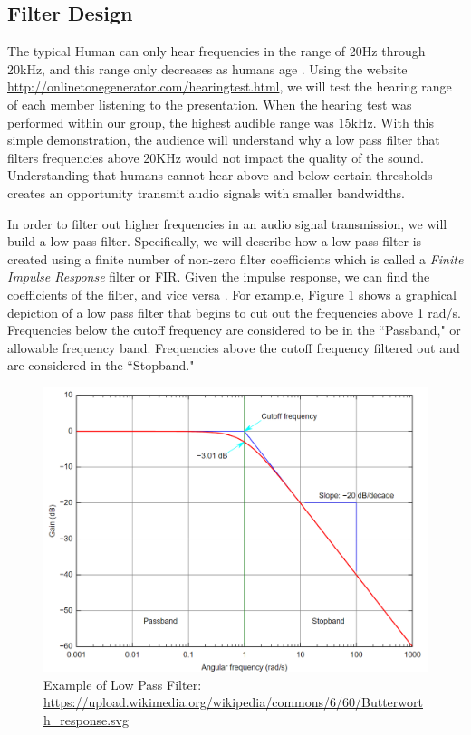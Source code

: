 \subsection{Filter Design}

The typical Human can only hear frequencies in the range of 20Hz through 20kHz, and this range only decreases as humans age  \cite{human:rg}.  Using the website \url{http://onlinetonegenerator.com/hearingtest.html}, we will test the hearing range of each member listening to the presentation.  When the hearing test was performed within our group, the highest audible range was 15kHz.  With this simple demonstration, the audience will understand why a low pass filter that filters frequencies above 20KHz would not impact the quality of the sound.  Understanding that humans cannot hear above and below certain thresholds creates an opportunity transmit audio signals with smaller bandwidths.  

In order to filter out higher frequencies in an audio signal transmission, we will build a low pass filter.  Specifically, we will describe how a low pass filter is created using a finite number of non-zero filter coefficients which is called a \textit{Finite Impulse Response} filter or FIR.  Given the impulse response, we can find the coefficients of the filter, and vice versa \cite{notes:class}.  For example, Figure \ref{fig:lowpass} shows a graphical depiction of a low pass filter that begins to cut out the frequencies above 1 rad/s.  Frequencies below the cutoff frequency are considered to be in the ``Passband," or allowable frequency band.  Frequencies above the cutoff frequency filtered out and are considered in the ``Stopband."  

\begin{figure}[h!]
	\centering
	\includegraphics[scale = .5]{low_pass.png} %
	\caption{Example of Low Pass Filter: \url{https://upload.wikimedia.org/wikipedia/commons/6/60/Butterworth_response.svg}}
	\label{fig:lowpass}
\end{figure}    
 
